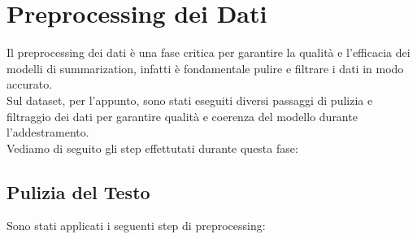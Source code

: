 \section{Preprocessing dei Dati}
Il preprocessing dei dati è una fase critica per garantire la qualità e l'efficacia dei modelli di summarization, infatti è fondamentale pulire e filtrare i dati in modo accurato.\\
Sul dataset, per l'appunto, sono stati eseguiti diversi passaggi di pulizia e filtraggio dei dati per garantire qualità e coerenza del modello durante l'addestramento.\\
Vediamo di seguito gli step effettutati durante questa fase:
\subsection{Pulizia del Testo}
Sono stati applicati i seguenti step di preprocessing:

